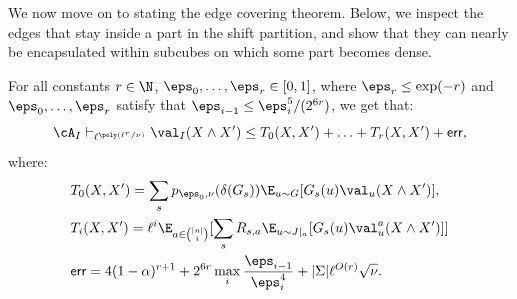 We now move on to stating the edge covering theorem. 
Below, we inspect the edges that stay inside a part in the shift partition, and show that they can nearly be encapsulated within subcubes on which some part becomes dense.
\begin{theorem}\label{thm:edge-covering-restated}
For all constants $r \in \N$, $\eps_0, \ldots, \eps_r \in [0,1]$, where $\eps_r \leq \exp(-r)$ and $\eps_0, \ldots, \eps_r$ satisfy that $\eps_{i-1} \leq \eps_i^5/(2^{6r})$, we get that:
\begin{equation}\label{eq:edge-cov-final}
\cA_I \vdash_{\ell^{\poly(\ell^r/\nu)}}  \val_I(X \wedge X') \leq T_0(X,X') + \ldots + T_r(X,X') + \sf{err},
\end{equation}
where:
\begin{align*}
&T_0(X,X') = \sum_s p_{\eps_0,\nu}(\delta(G_s))\E_{u \sim G}[ G_s(u)\val_u(X \wedge X')],\\
&T_i(X,X') = \ell^{i}\E_{a \in {[n] \choose i}}[\sum_s R_{s,a}
\E_{u \sim J|_a}[G_s(u)\val^a_u(X \wedge X')]] \\
&{\sf err} = 4(1-\alpha)^{r+1} + 2^{6r}\max_{i}\frac{\eps_{i-1}}{\eps_i^4}+ |\Sigma|\ell^{O(r)}\sqrt{\nu}.
\end{align*}
\end{theorem}

